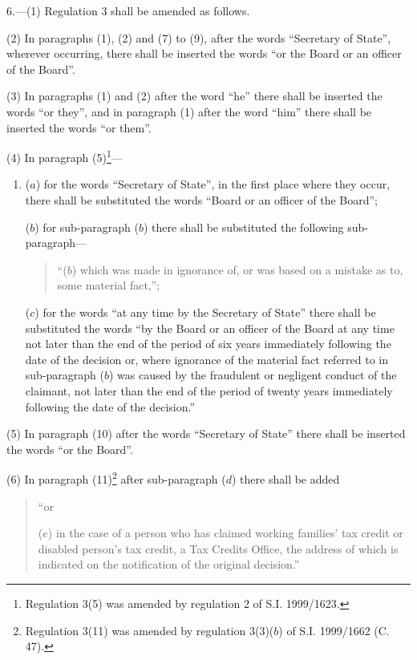 \documentclass[12pt,a4paper]{article}
\begin{document}

\medskip

6.---(1)  Regulation 3 shall be amended as follows.

(2) In paragraphs (1), (2) and (7) to (9), after the words “Secretary of State”, wherever occurring, there shall be inserted the words “or the Board or an officer of the Board”.

(3) In paragraphs (1) and (2) after the word “he” there shall be inserted the words “or they”, and in paragraph (1) after the word “him” there shall be inserted the words “or them”.

(4) In paragraph (5)\footnote{\frenchspacing Regulation 3(5) was amended by regulation 2 of S.I. 1999/1623.}—
\begin{enumerate}\item[]
($a$) for the words “Secretary of State”, in the first place where they occur, there shall be substituted the words “Board or an officer of the Board”;

($b$) for sub-paragraph ($b$)  there shall be substituted the following sub-paragraph—
\begin{quotation}
“($b$) which was made in ignorance of, or was based on a mistake as to, some material 
fact,”;
\end{quotation}

($c$) for the words “at any time by the Secretary of State” there shall be substituted the words “by the Board or an officer of the Board at any time not later than the end of the period of six years immediately following the date of the decision or, where ignorance of the material fact referred to in sub-paragraph ($b$)  was caused by the fraudulent or negligent conduct of the claimant, not later than the end of the period of twenty years immediately following the date of the decision.”
\end{enumerate}

(5) In paragraph (10) after the words “Secretary of State” there shall be inserted the words “or the Board”.

(6) In paragraph (11)\footnote{\frenchspacing Regulation 3(11) was amended by regulation 3(3)($b$) of S.I. 1999/1662 (C. 47).} after sub-paragraph ($d$)  there shall be added
\begin{quotation}
“or

($e$) in the case of a person who has claimed working families' tax credit or disabled person’s tax credit, a Tax Credits Office, the address of which is indicated on the notification of the original decision.”
\end{quotation}
\end{document}
